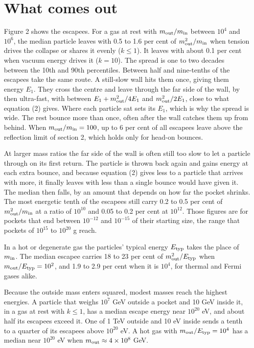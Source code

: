 \documentclass[10pt,twocolumn,a4paper]{article}
\begin{document}
\section{What comes out}

Figure 2 shows the escapees. For a gas at rest with $m_{\rm out}/m_{\rm in}$ between $10^4$ and
$10^6$, the median particle leaves with 0.5 to 1.6 per cent of $m_{\rm out}^2/m_{\rm in}$ when
tension drives the collapse or shares it evenly ($k \le 1$). It leaves with about 0.1 per cent when
vacuum energy drives it ($k = 10$). The spread is one to two decades between the 10th and 90th
percentiles. Between half and nine-tenths of the escapees take the same route. A still-slow wall
hits them once, giving them energy $E_1$. They cross the centre and leave through the far side of
the wall, by then ultra-fast, with between $E_1 + m_{\rm out}^2/4E_1$ and $m_{\rm out}^2/2E_1$,
close to what equation (2) gives. Where each particle sat sets its $E_1$, which is why the spread is
wide. The rest bounce more than once, often after the wall catches them up from behind. When $m_{\rm
out}/m_{\rm in} = 100$, up to 6 per cent of all escapees leave above the reflection limit of section
2, which holds only for head-on bounces.

At larger mass ratios the far side of the wall is often still too slow to let a particle through on
its first return. The particle is thrown back again and gains energy at each extra bounce, and
because equation (2) gives less to a particle that arrives with more, it finally leaves with less
than a single bounce would have given it. The median then falls, by an amount that depends on how
far the pocket shrinks. The most energetic tenth of the escapees still carry 0.2 to 0.5 per cent of
$m_{\rm out}^2/m_{\rm in}$ at a ratio of $10^{10}$ and 0.05 to 0.2 per cent at $10^{12}$. Those
figures are for pockets that end between $10^{-12}$ and $10^{-15}$ of their starting size, the range
that pockets of $10^{15}$ to $10^{20}$ g reach.

In a hot or degenerate gas the particles' typical energy $E_{\rm typ}$ takes the place of $m_{\rm
in}$. The median escapee carries 18 to 23 per cent of $m_{\rm out}^2/E_{\rm typ}$ when $m_{\rm
out}/E_{\rm typ} = 10^2$, and 1.9 to 2.9 per cent when it is $10^4$, for thermal and Fermi gases
alike.

Because the outside mass enters squared, modest masses reach the highest energies. A particle that
weighs $10^7$ GeV outside a pocket and 10 GeV inside it, in a gas at rest with $k \le 1$, has a
median escape energy near $10^{20}$ eV, and about half its escapees exceed it. One of 1 TeV outside
and 10 eV inside sends a tenth to a quarter of its escapees above $10^{20}$ eV. A hot gas with
$m_{\rm out}/E_{\rm typ} = 10^4$ has a median near $10^{20}$ eV when $m_{\rm out} \approx
4\times10^8$ GeV.
\end{document}
